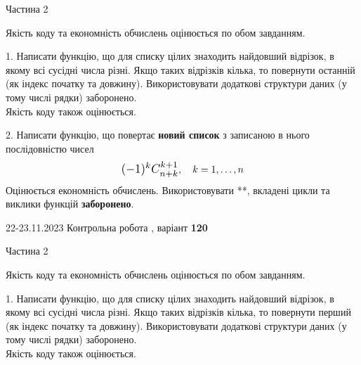 \documentclass[12pt, ukrainian]{article}
\begin{document}
{{{{{{{{{{{{{{{{{{\begin {Huge}
\begin{center}Частина 2
\end{center}
\vspace{10mm}
\end {Huge}

{
\begin {Large}
Якість коду та економність обчислень оцінюється по обом завданням.

\vspace{5mm}

1. Написати функцію, що для списку цілих знаходить найдовший відрізок, в якому всі сусідні числа різні. Якщо таких відрізків кілька, то повернути останній (як індекс початку та довжину). Використовувати додаткові структури даних (у тому числі рядки) заборонено.\\	Якість коду також оцінюється. 



\vspace{10mm}



2. 
Написати функцію, що повертає \textbf{новий список} з записаною в нього послідовністю чисел
$$\scalebox{1.2}{$(-1)^{k}C_{n+k}^{k+1}$}, \quad k=1,\ldots,n$$
Оцінюється економність обчислень. Використовувати **, вкладені цикли та виклики функцій \textbf{заборонено}.

\end{Large}\newpage




\begin {Huge}
{{22-23.11.2023 Контрольна робота , варіант  \No \textbf { 120 }\par}}

\begin{center}Частина 2
\end{center}
\vspace{10mm}
\end {Huge}

{
\begin {Large}
Якість коду та економність обчислень оцінюється по обом завданням.

\vspace{5mm}

1. Написати функцію, що для списку цілих знаходить найдовший відрізок, в якому всі сусідні числа різні. Якщо таких відрізків кілька, то повернути перший (як індекс початку та довжину). Використовувати додаткові структури даних (у тому числі рядки) заборонено.\\	Якість коду також оцінюється. 




\end{Large}}}}}}}}}}}}}}}}}}}}}
\end{document}
